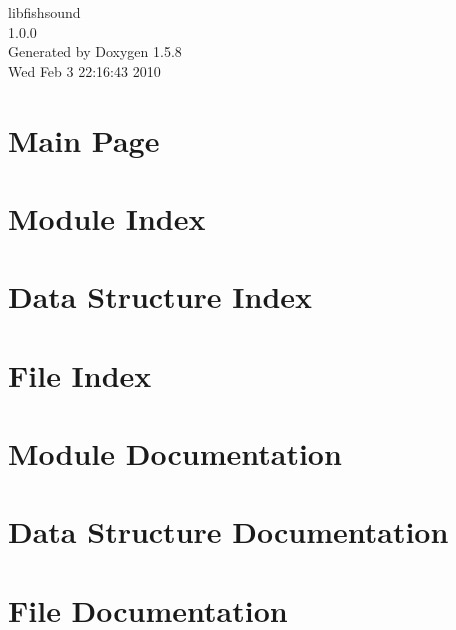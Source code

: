 \documentclass[a4paper]{book}
\begin{document}
\begin{titlepage}
\vspace*{7cm}
\begin{center}
{\Large libfishsound \\[1ex]\large 1.0.0 }\\
\vspace*{1cm}
{\large Generated by Doxygen 1.5.8}\\
\vspace*{0.5cm}
{\small Wed Feb 3 22:16:43 2010}\\
\end{center}
\end{titlepage}
\clearemptydoublepage
{}
\tableofcontents
\clearemptydoublepage
{}
\chapter{Main Page}
\label{index}
\chapter{Module Index}

\chapter{Data Structure Index}

\chapter{File Index}

\chapter{Module Documentation}







\chapter{Data Structure Documentation}



\chapter{File Documentation}






\printindex
\end{document}
